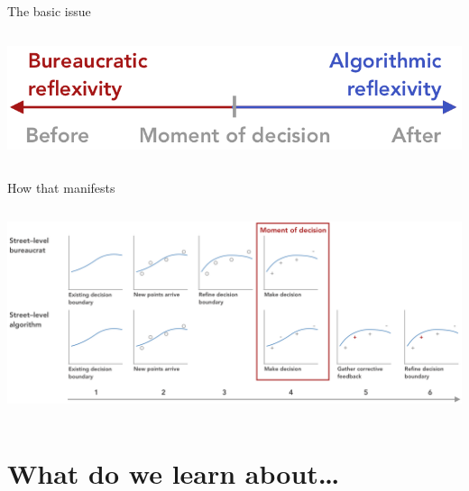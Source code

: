 \documentclass[presentation]{subfiles}
\begin{document}
\begin{frame}{The basic issue}
  \begin{columns}[T]
    \begin{column}{0.99\textwidth}
      \centering
      \includegraphics[max width=\linewidth,keepaspectratio]{figures/timeline.png}
    \end{column}
  \end{columns}
\end{frame}


\begin{frame}{How that manifests}
  \begin{columns}[T]
    \begin{column}{0.99\textwidth}
      \centering
      \includegraphics[max width=\linewidth,keepaspectratio]{figures/Curves.png}
    \end{column}
  \end{columns}
\end{frame}

\section{What do we learn about\dots}
\end{document}
